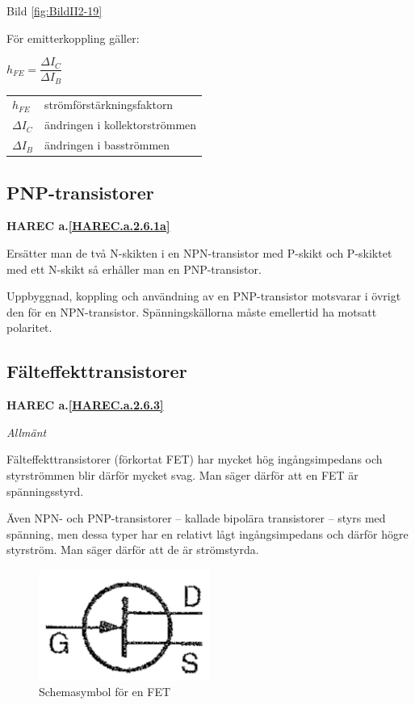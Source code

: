 Bild \ref{fig:BildII2-19}

För emitterkoppling gäller:

\(h_{FE} = \dfrac{\Delta I_C}{\Delta I_B}\)

\begin{tabular}{ll}
  \(h_{FE}\) & strömförstärkningsfaktorn \\
  \(\Delta I_C\)   & ändringen i kollektorströmmen \\
  \(\Delta I_B\)   & ändringen i basströmmen \\
\end{tabular}

\subsection{PNP-transistorer}
\textbf{HAREC a.\ref{HAREC.a.2.6.1a}\label{myHAREC.a.2.6.1a}}

Ersätter man de två N-skikten i en NPN-transistor med P-skikt och P-skiktet med
ett N-skikt så erhåller man en PNP-transistor.

Uppbyggnad, koppling och användning av en PNP-transistor motsvarar i övrigt den
för en NPN-transistor. Spänningskällorna måste emellertid ha motsatt polaritet.

\subsection{Fälteffekttransistorer}
\textbf{HAREC a.\ref{HAREC.a.2.6.3}\label{myHAREC.a.2.6.3}}

\emph{Allmänt}

Fälteffekttransistorer (förkortat FET) har mycket hög ingångsimpedans och
styrströmmen blir därför mycket svag. Man säger därför att en FET är
spänningsstyrd.

Även NPN- och PNP-transistorer -- kallade bipolära transistorer -- styrs med
spänning, men dessa typer har en relativt lågt ingångsimpedans och därför högre
styrström. Man säger därför att de är strömstyrda.

\begin{figure}
\includegraphics[width=0.5\textwidth]{images/cropped_pdfs/bild_2_2-20.pdf}
\caption{Schemasymbol för en FET}
\label{fig:BildII2-20}
\end{figure}

